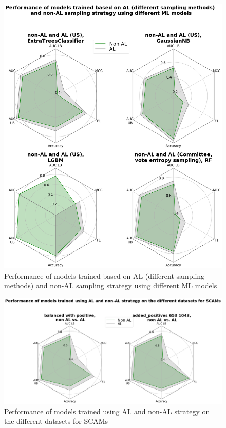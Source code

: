 \documentclass[a4paper,10pt]{article}
\begin{document}
\begin{figure}
    \centering
    \includegraphics[keepaspectratio=true, scale=0.32]{images/models_and_sampling.png}
    \caption{Performance of models trained based on AL (different sampling methods) and non-AL sampling strategy using different ML models}
    \label{fig:2}
\end{figure}

\begin{figure}
    \centering
    \includegraphics[keepaspectratio=true, scale=0.32]{images/different_data.png}
    \caption{Performance of models trained using AL and non-AL strategy on the different datasets for SCAMs}
    \label{fig:3}
\end{figure}
\end{document}
